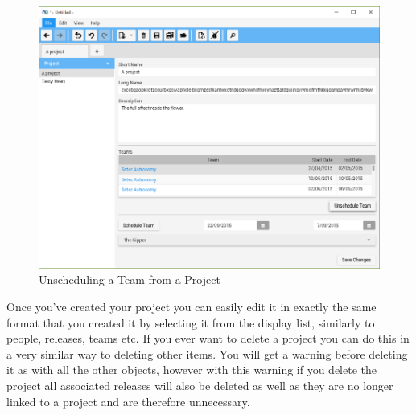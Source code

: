 \begin{figure}[H]
\centering
\includegraphics[width=\textwidth]{images/screenshots/projects3.PNG}
\caption{Unscheduling a Team from a Project}
\label{fig:new_project}
\end{figure}

Once you've created your project you can easily edit it in exactly the same format that you created it by selecting it from the display list, similarly to people, releases, teams etc. If you ever want to delete a project you can do this in a very similar way to deleting other items. You will get a warning before deleting it as with all the other objects, however with this warning if you delete the project all associated releases will also be deleted as well as they are no longer linked to a project and are therefore unnecessary.